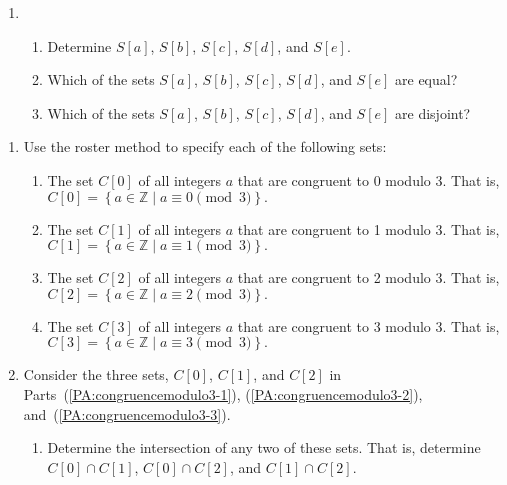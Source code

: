 \begin{previewactivity}
\begin{enumerate}
\item \begin{enumerate}
\item Determine  $S[ a ]$, $S[ b ]$, $S[ c ]$, 
      $S[ d ]$, and $S[ e ]$.

\item Which of the sets  $S[ a ]$, $S[ b ]$, $S[ c ]$, 
      $S[ d ]$, and $S[ e ]$ are equal?

\item Which of the sets  $S[ a ]$, $S[ b ]$, $S[ c ]$, 
      $S[ d ]$, and $S[ e ]$ are disjoint?
\end{enumerate}

\end{enumerate}

\end{previewactivity}
\hbreak
%
\begin{previewactivity}\label{PA:congruencemodulo3} \hfill
\begin{enumerate}
\item Use the roster method to specify each of the following sets:

\begin{enumerate}
\item The set  $C[ 0 ]$ of all integers  $a$  that are congruent to 0 modulo 3.   That is, 
\label{PA:congruencemodulo3-1}%
$C[ 0 ] = \left\{ { {a \in \mathbb{Z} } \mid a \equiv 0 \pmod 3} \right\}\!.$
%
\item The set  $C[ 1 ]$ of all integers  $a$  that are congruent to 1 modulo 3.   That is, 
\label{PA:congruencemodulo3-2}%
$C[ 1 ] = \left\{ { {a \in \mathbb{Z} } \mid a \equiv 1 \pmod 3} \right\}\!.$
%
\item The set  $C[ 2 ]$ of all integers  $a$  that are congruent to 2 modulo 3.   That is, 
\label{PA:congruencemodulo3-3}%
$C[ 2 ] = \left\{ { {a \in \mathbb{Z} } \mid a \equiv 2 \pmod 3} \right\}\!.$
%
\item The set  $C[ 3 ]$ of all integers  $a$  that are congruent to 3 modulo 3.   That is, 
$C[ 3 ] = \left\{ { {a \in \mathbb{Z} } \mid a \equiv 3 \pmod 3} \right\}\!.$
\end{enumerate}

\item Consider the three sets, $C[ 0 ]$, $C[ 1 ]$,  and 
$C[ 2 ]$ in Parts~(\ref{PA:congruencemodulo3-1}), (\ref{PA:congruencemodulo3-2}), 
and~(\ref{PA:congruencemodulo3-3}).
\begin{enumerate}
  \item Determine the intersection of any two of these sets.  That is,  determine  
  $C[ 0 ] \cap C[ 1 ]$, $C[ 0 ] \cap C[ 2 ]$,        and  $C[ 1 ] \cap C[ 2 ]$. 


\end{enumerate}
\end{enumerate}
\end{previewactivity}
